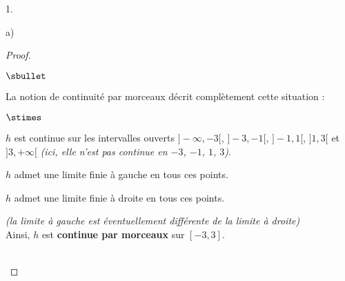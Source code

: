 \begin{noliste}{1.}
\begin{noliste}{a)}
\begin{proof}
\begin{remark}
\begin{noliste}{$\sbullet$}
        \item La notion de continuité par morceaux décrit complètement
          cette situation :
          \begin{noliste}{$\stimes$}
          \item $h$ est continue sur les intervalles ouverts
            $]-\infty, -3[$, $]-3, -1[$, $]-1, 1[$, $]1, 3[$ et $]3,
            +\infty[$ {\it(ici, elle n'est pas continue en $-3$, $-1$,
              $1$, $3$)}.
          \item $h$ admet une limite finie à gauche en tous ces
            points.
          \item $h$ admet une limite finie à droite en tous ces
            points.
          \end{noliste}
          {\it (la limite à gauche est éventuellement différente de la
            limite à droite)}\\
          Ainsi, $h$ est {\bf continue par morceaux} sur $[-3,3]$.
        \end{noliste}
      \end{remark}~\\[-1.2cm]

\end{proof}
\end{noliste}
\end{noliste}
